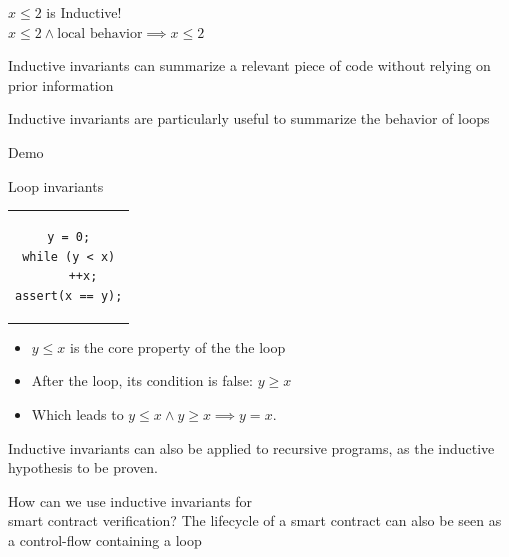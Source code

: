 \documentclass[aspectratio=169,10pt]{beamer}
\begin{document}
\begin{frame}
\begin{center}
$x \le 2$ is Inductive!\\
$x \le 2 \land \text{local behavior} \implies x \le 2$
\end{center}
\end{frame}

\begin{frame}{Inductive invariants}
	can summarize a relevant piece of code without relying on prior information
\end{frame}

\begin{frame}{Inductive invariants}
	are particularly useful to summarize the behavior of loops
\end{frame}

\begin{frame}
Demo
\end{frame}

\begin{frame}[fragile]{Loop invariants}
\begin{center}
\begin{tabular}{c}
\begin{lstlisting}[basicstyle=\small]
y = 0;
while (y < x)
    ++x;
assert(x == y);
\end{lstlisting}
\end{tabular}
\end{center}

\begin{itemize}
	\item $y \le x$ is the core property of the the loop
	\item After the loop, its condition is false: $y \ge x$
	\item Which leads to $y \le x \land y \ge x \implies y = x$.
\end{itemize}
\end{frame}

\begin{frame}{Inductive invariants}
	can also be applied to recursive programs,
	as the inductive hypothesis to be proven.
\end{frame}

\begin{frame}{How can we use inductive invariants for\\smart contract verification?}
	The lifecycle of a smart contract can also be seen as a control-flow containing a loop
\end{frame}
\end{document}
